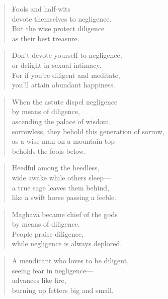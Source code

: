 \documentclass[12pt,openany]{book}%
\begin{document}
\begin{verse}%
Fools and half-wits \\
devote themselves to negligence. \\
But the wise protect diligence \\
as their best treasure. 

%
\end{verse}

\begin{verse}%
Don’t devote yourself to negligence, \\
or delight in sexual intimacy. \\
For if you’re diligent and meditate, \\
you’ll attain abundant happiness. 

%
\end{verse}

\begin{verse}%
When the astute dispel negligence \\
by means of diligence, \\
ascending the palace of wisdom, \\
sorrowless, they behold this generation of sorrow, \\
as a wise man on a mountain-top \\
beholds the fools below. 

%
\end{verse}

\begin{verse}%
Heedful among the heedless, \\
wide awake while others sleep—\\
a true sage leaves them behind, \\
like a swift horse passing a feeble. 

%
\end{verse}

\begin{verse}%
\textsanskrit{Maghavā} became chief of the gods \\
by means of diligence. \\
People praise diligence, \\
while negligence is always deplored. 

%
\end{verse}

\begin{verse}%
A mendicant who loves to be diligent, \\
seeing fear in negligence—\\
advances like fire, \\
burning up fetters big and small. 

%
\end{verse}
\end{document}
